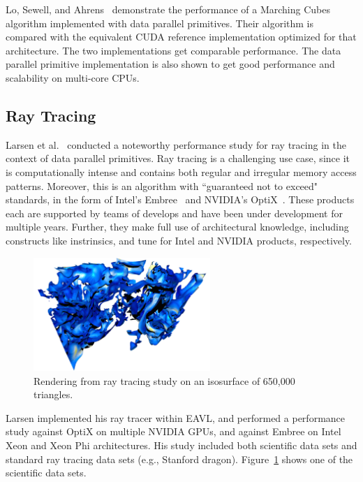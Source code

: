 \documentclass{superfri}
\newcommand*{\scite}[1]{~\cite{#1}}
\newcommand{\etal}{et al.\xspace}
\begin{document}
Lo, Sewell, and Ahrens\scite{PISTON} demonstrate the performance of a
Marching Cubes algorithm implemented with data parallel primitives. Their
algorithm is compared with the equivalent CUDA reference implementation
optimized for that architecture. The two implementations get comparable
performance. The data parallel primitive implementation is also shown to
get good performance and scalability on multi-core CPUs.

\subsection{Ray Tracing}

Larsen \etal\scite{Larsen:PacVis2015} conducted a noteworthy performance study 
for ray tracing in the context of data parallel primitives.
%
Ray tracing is a challenging use case, since it is computationally
intense and contains both regular and irregular memory access patterns.
%
Moreover, this is an algorithm with ``guaranteed not to exceed"
standards, in the form of Intel's Embree\scite{wald2014embree} and
NVIDIA's OptiX\scite{parker2010optix}.
%
These products each are supported by teams of develops and have been under
development for multiple years. 
%
Further, they make full use of architectural knowledge, including
constructs like instrinsics, and tune for 
Intel and NVIDIA products, respectively.

\begin{figure}
  \vspace{-\baselineskip}
  \includegraphics[width=2.64in]{images/rm650_teaser}
  \caption{Rendering from ray tracing study on an isosurface of 650,000 triangles.\\}
  \label{fig:raytracing}
  \vspace{-\baselineskip}
\end{figure}
Larsen implemented his ray tracer within EAVL, and performed a performance
study against OptiX on multiple NVIDIA GPUs, and against Embree on Intel Xeon
and Xeon Phi architectures.  
%
His study included both scientific data sets and standard
ray tracing data sets (e.g., Stanford dragon).
%
Figure~\ref{fig:raytracing} shows one of the scientific data sets.
\end{document}
